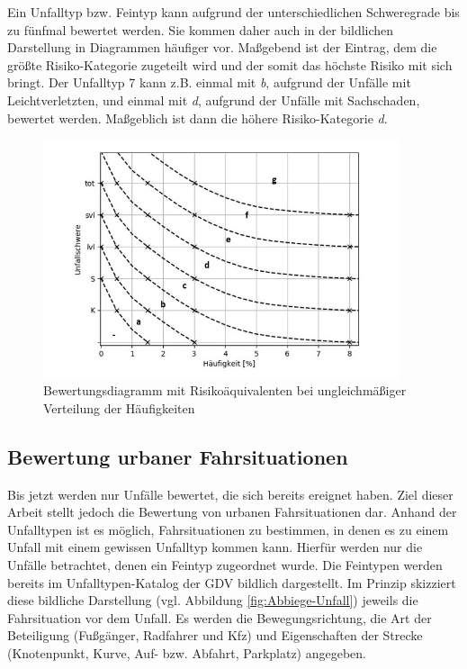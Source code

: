 Ein Unfalltyp bzw. Feintyp kann aufgrund der unterschiedlichen Schweregrade bis zu fünfmal bewertet werden. Sie kommen daher auch in der bildlichen Darstellung in Diagrammen häufiger vor. Maßgebend ist der Eintrag, dem die größte Risiko-Kategorie zugeteilt wird und der somit das höchste Risiko mit sich bringt. Der Unfalltyp 7 kann z.B. einmal mit \textit{b}, aufgrund der Unfälle mit Leichtverletzten, und einmal mit \textit{d}, aufgrund der Unfälle mit Sachschaden, bewertet werden. Maßgeblich ist dann die höhere Risiko-Kategorie \textit{d}.

\begin{savenotes}
	\begin{figure}[H]
		\centering
		\includegraphics[width=10.5cm,height=7cm]{figures/Bewertungsdiagramm(2)}
		\caption[Bewertungsdiagramm mit Risikoäquivalenten bei ungleichmäßiger Verteilung der Häufigkeiten]{Bewertungsdiagramm mit Risikoäquivalenten bei ungleichmäßiger Verteilung der Häufigkeiten}\label{fig:Bewertungsdiagramm(2)}
	\end{figure}
\end{savenotes}

\subsection{Bewertung urbaner Fahrsituationen}\label{subsection:Bewertungs urbaner Fahrsituationen}
Bis jetzt werden nur Unfälle bewertet, die sich bereits ereignet haben. Ziel dieser Arbeit stellt jedoch die Bewertung von urbanen Fahrsituationen dar. Anhand der Unfalltypen ist es möglich, Fahrsituationen zu bestimmen, in denen es zu einem Unfall mit einem gewissen Unfalltyp kommen kann. Hierfür werden nur die Unfälle betrachtet, denen ein Feintyp zugeordnet wurde. Die Feintypen werden bereits im Unfalltypen-Katalog der GDV bildlich dargestellt. Im Prinzip skizziert diese bildliche Darstellung (vgl. Abbildung \ref{fig:Abbiege-Unfall}) jeweils die Fahrsituation vor dem Unfall. Es werden die Bewegungsrichtung, die Art der Beteiligung (Fußgänger, Radfahrer und Kfz) und Eigenschaften der Strecke (Knotenpunkt, Kurve, Auf- bzw. Abfahrt, Parkplatz) angegeben.

